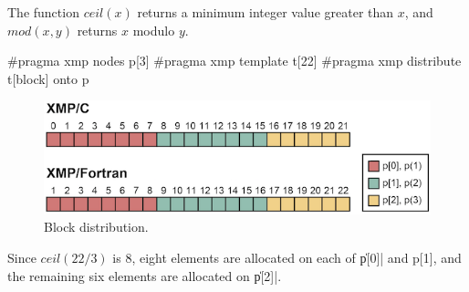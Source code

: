 \begin{mynote}
  The function $ceil(x)$ returns a minimum integer value greater than
  $x$, and $mod(x,y)$ returns $x$ modulo $y$.
\end{mynote}

\begin{XCexample}
#pragma xmp nodes p[3]
#pragma xmp template t[22]
#pragma xmp distribute t[block] onto p
\end{XCexample}


\begin{figure}
  \centering
  \includegraphics{figs/block.png}
  \caption{Block distribution.}
\end{figure}

Since $ceil(22/3)$ is 8, eight elements are allocated on each of \|p[0]|
and p[1], and the remaining six elements are allocated on \|p[2]|.







